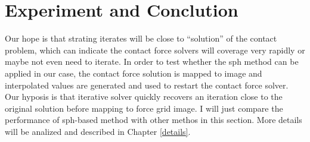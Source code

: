 \section{Experiment and Conclution}
    \label{sec:sph-exp}
    Our hope is that strating iterates will be close to ``solution'' of the contact problem, which can indicate the contact force solvers will coverage very rapidly or maybe not even need to iterate. In order to test whether the sph method can be applied in our case, the contact force solution is mapped to image and interpolated values are generated and used to restart the contact force solver. Our hyposis is that iterative solver quickly recovers an iteration close to the original solution before mapping to force grid image. I will just compare the performance of sph-based method with other methos in this section. More details will be analized and described in Chapter \ref{details}.

